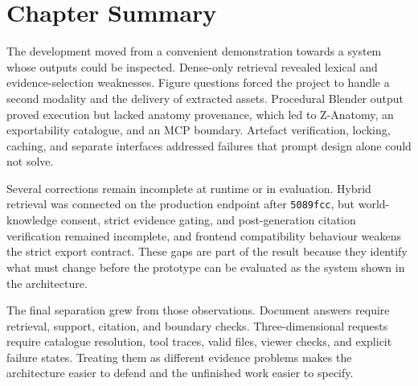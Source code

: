 \section{Chapter Summary}
\label{sec:evolution-summary}

The development moved from a convenient demonstration towards a system whose outputs could be inspected. Dense-only retrieval revealed lexical and evidence-selection weaknesses. Figure questions forced the project to handle a second modality and the delivery of extracted assets. Procedural Blender output proved execution but lacked anatomy provenance, which led to Z-Anatomy, an exportability catalogue, and an MCP boundary. Artefact verification, locking, caching, and separate interfaces addressed failures that prompt design alone could not solve.

Several corrections remain incomplete at runtime or in evaluation. Hybrid retrieval was connected on the production endpoint after \texttt{5089fcc}, but world-knowledge consent, strict evidence gating, and post-generation citation verification remained incomplete, and frontend compatibility behaviour weakens the strict export contract. These gaps are part of the result because they identify what must change before the prototype can be evaluated as the system shown in the architecture.

The final separation grew from those observations. Document answers require retrieval, support, citation, and boundary checks. Three-dimensional requests require catalogue resolution, tool traces, valid files, viewer checks, and explicit failure states. Treating them as different evidence problems makes the architecture easier to defend and the unfinished work easier to specify.
